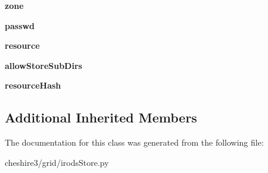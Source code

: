 \begin{DoxyCompactItemize}
\item 
\hypertarget{classcheshire3_1_1grid_1_1irods_store_1_1_irods_index_store_a9118423d8a9942d88126bf826c088ce9}{{\bfseries zone}}\label{classcheshire3_1_1grid_1_1irods_store_1_1_irods_index_store_a9118423d8a9942d88126bf826c088ce9}

\item 
\hypertarget{classcheshire3_1_1grid_1_1irods_store_1_1_irods_index_store_a9b07e6924e9df8186844b23fdd14ff32}{{\bfseries passwd}}\label{classcheshire3_1_1grid_1_1irods_store_1_1_irods_index_store_a9b07e6924e9df8186844b23fdd14ff32}

\item 
\hypertarget{classcheshire3_1_1grid_1_1irods_store_1_1_irods_index_store_a30b739037fa6816e657a50d8614a71b3}{{\bfseries resource}}\label{classcheshire3_1_1grid_1_1irods_store_1_1_irods_index_store_a30b739037fa6816e657a50d8614a71b3}

\item 
\hypertarget{classcheshire3_1_1grid_1_1irods_store_1_1_irods_index_store_ae68aa93493521639f26171ebbf4994f6}{{\bfseries allow\-Store\-Sub\-Dirs}}\label{classcheshire3_1_1grid_1_1irods_store_1_1_irods_index_store_ae68aa93493521639f26171ebbf4994f6}

\item 
\hypertarget{classcheshire3_1_1grid_1_1irods_store_1_1_irods_index_store_a8654c9cb2429d150b1c1b4b49923ef00}{{\bfseries resource\-Hash}}\label{classcheshire3_1_1grid_1_1irods_store_1_1_irods_index_store_a8654c9cb2429d150b1c1b4b49923ef00}

\end{DoxyCompactItemize}
\subsection*{Additional Inherited Members}


The documentation for this class was generated from the following file\-:\begin{DoxyCompactItemize}
\item 
cheshire3/grid/irods\-Store.\-py\end{DoxyCompactItemize}
